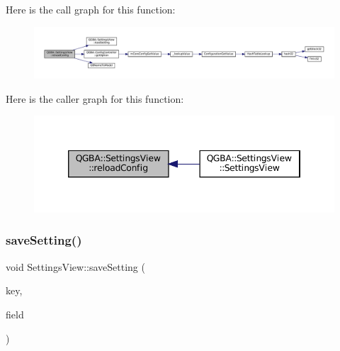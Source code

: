 Here is the call graph for this function\+:
\nopagebreak
\begin{figure}[H]
\begin{center}
\leavevmode
\includegraphics[width=350pt]{class_q_g_b_a_1_1_settings_view_a9e9647e7a375c5e48d501966fa316a15_cgraph}
\end{center}
\end{figure}
Here is the caller graph for this function\+:
\nopagebreak
\begin{figure}[H]
\begin{center}
\leavevmode
\includegraphics[width=346pt]{class_q_g_b_a_1_1_settings_view_a9e9647e7a375c5e48d501966fa316a15_icgraph}
\end{center}
\end{figure}
\mbox{\label{class_q_g_b_a_1_1_settings_view_a19415746baafd248bbfa3881de875d4f}} 
\subsubsection{\texorpdfstring{save\+Setting()}{saveSetting()}\hspace{0.1cm}{\footnotesize\ttfamily [1/7]}}
{\footnotesize\ttfamily void Settings\+View\+::save\+Setting (\begin{DoxyParamCaption}\item[{const char $\ast$}]{key,  }\item[{const Q\+Abstract\+Button $\ast$}]{field }\end{DoxyParamCaption})\hspace{0.3cm}{\ttfamily [private]}}

